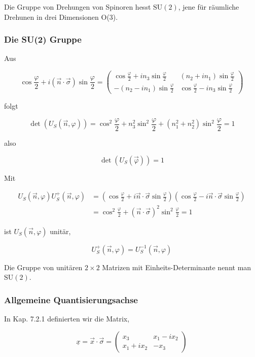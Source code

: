 \documentclass[10pt, letterpaper]{article}
\begin{document}
Die Gruppe von Drehungen von Spinoren hesst $\mathrm{SU}(2)$, jene für räumliche Drehunen in drei Dimensionen O(3).

\subsubsection*{Die SU(2) Gruppe}
Aus

$$
\cos \frac{\varphi}{2}+i(\vec{n} \cdot \vec{\sigma}) \sin \frac{\varphi}{2}=\left(\begin{array}{cc}
\cos \frac{\varphi}{2}+i n_{3} \sin \frac{\varphi}{2} & \left(n_{2}+i n_{1}\right) \sin \frac{\varphi}{2} \\
-\left(n_{2}-i n_{1}\right) \sin \frac{\varphi}{2} & \cos \frac{\varphi}{2}-i n_{3} \sin \frac{\varphi}{2}
\end{array}\right)
$$

folgt

$$
\operatorname{det}\left(U_{S}(\vec{n}, \varphi)\right)=\cos ^{2} \frac{\varphi}{2}+n_{3}^{2} \sin ^{2} \frac{\varphi}{2}+\left(n_{1}^{2}+n_{2}^{2}\right) \sin ^{2} \frac{\varphi}{2}=1
$$

also

$$
\operatorname{det}\left(U_{S}(\vec{\varphi})\right)=1
$$

Mit

$$
\begin{aligned}
U_{S}(\vec{n}, \varphi) U_{S}^{+}(\vec{n}, \varphi) & =\left(\cos \frac{\varphi}{2}+i \vec{n} \cdot \vec{\sigma} \sin \frac{\varphi}{2}\right)\left(\cos \frac{\varphi}{2}-i \vec{n} \cdot \vec{\sigma} \sin \frac{\varphi}{2}\right) \\
& =\cos ^{2} \frac{\varphi}{2}+(\vec{n} \cdot \vec{\sigma})^{2} \sin ^{2} \frac{\varphi}{2}=1
\end{aligned}
$$

ist $U_{S}(\vec{n}, \varphi)$ unitär,

$$
U_{S}^{+}(\vec{n}, \varphi)=U_{S}^{-1}(\vec{n}, \varphi)
$$

Die Gruppe von unitären $2 \times 2$ Matrizen mit Einheits-Determinante nennt man $\mathrm{SU}(2)$.

\subsubsection*{Allgemeine Quantisierungsachse}
In Kap. 7.2.1 definierten wir die Matrix,

$$
\underline{x}=\vec{x} \cdot \vec{\sigma}=\left(\begin{array}{cc}
x_{3} & x_{1}-i x_{2} \\
x_{1}+i x_{2} & -x_{3}
\end{array}\right)
$$
\end{document}
